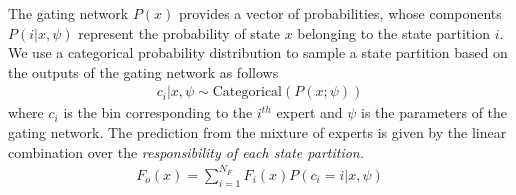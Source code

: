 The gating network $P(x)$ provides a vector of probabilities, whose
components $P(i | x, \psi)$ represent the probability of state $x$ belonging to
the state partition $i$.
%
We use a categorical probability distribution to sample a state partition based
on the outputs of the gating network as follows~\cite{harkonen2022mixtures} 
\begin{align}
  c_i | x, \psi \sim \text{Categorical}(P(x; \psi)) 
  \label{eq:gating_categorical}
\end{align}
\noindent where $c_i$ is the bin corresponding to the $i^{th}$ expert and $\psi$
is the parameters of the gating network.
%
The prediction from the mixture of experts is given by the linear combination over
the \it{responsibility} \normalfont of each state partition.
%
\begin{align*}
  F_o(x) = \sum_{i=1}^{N_F}F_i(x)P(c_i=i | x, \psi)
\end{align*}



